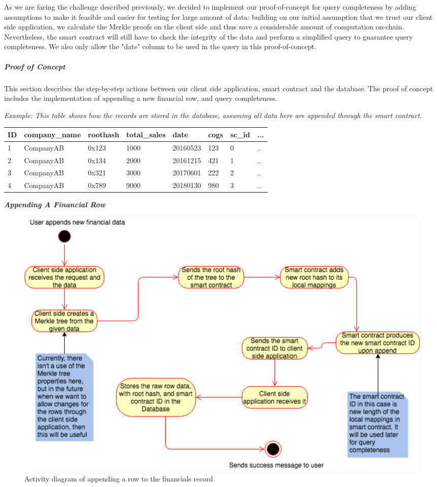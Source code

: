 As we are facing the challenge described previously, we decided to implement our proof-of-concept for query completeness by adding assumptions to make it feasible and easier for testing for large amount of data: building on our initial assumption that we trust our client side application, we calculate the Merkle proofs on the client side and thus save a considerable amount of computation on-chain. Nevertheless, the smart contract will still have to check the integrity of the data and perform a simplified query to guarantee query completeness. We also only allow the "date" column to be used in the query in this proof-of-concept.

\subparagraph{Proof of Concept}

This section describes the step-by-step actions between our client side application, smart contract and the database. The proof of concept includes the implementation of appending a new financial row, and query completeness.

\textit{Example: This table shows how the records are stored in the database, assuming all data here are appended through the smart contract.}
\begin{center}
    \begin{tabular}{| l | l | l | l | l | l | l | l |}
    \hline
    ID & company\_name & roothash & total\_sales & date & cogs & sc\_id & ... \\ \hline
    1 & CompanyAB & 0x123 & 1000 & 20160523 & 123 & 0 & .. \\ \hline
    2 & CompanyAB & 0x134 & 2000 & 20161215 & 421 & 1 & .. \\ \hline
    3 & CompanyAB & 0x321 & 3000 & 20170601 & 222 & 2 & .. \\ \hline
    4 & CompanyAB & 0x789 & 9000 & 20180130 & 980 & 3 & .. \\ \hline
    \end{tabular}
\end{center}



\textbf{\textit{Appending A Financial Row}}

\begin{figure}[h]%
\centering
\includegraphics[width=1.0\textwidth]{images/appendRowFinancials.png}
\caption{\label{fig:appendRowFinancials}Activity diagram of appending a row to the financials record}
\end{figure}

